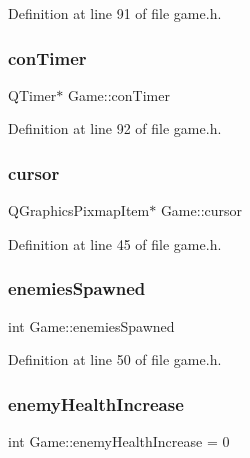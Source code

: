 Definition at line 91 of file game.\+h.

\mbox{\label{class_game_a266d51c575b09c22aac86e20487802f4}} 
\subsubsection{\texorpdfstring{con\+Timer}{conTimer}}
{\footnotesize\ttfamily Q\+Timer$\ast$ Game\+::con\+Timer}



Definition at line 92 of file game.\+h.

\mbox{\label{class_game_ac8bde3bd16f503846f66bbb866c3b7b9}} 
\subsubsection{\texorpdfstring{cursor}{cursor}}
{\footnotesize\ttfamily Q\+Graphics\+Pixmap\+Item$\ast$ Game\+::cursor}



Definition at line 45 of file game.\+h.

\mbox{\label{class_game_a6ac18c388eda83ceb3212e099b3b8473}} 
\subsubsection{\texorpdfstring{enemies\+Spawned}{enemiesSpawned}}
{\footnotesize\ttfamily int Game\+::enemies\+Spawned}



Definition at line 50 of file game.\+h.

\mbox{\label{class_game_ac0038cbbcfbd5d8b32600cd9f42cd09b}} 
\subsubsection{\texorpdfstring{enemy\+Health\+Increase}{enemyHealthIncrease}}
{\footnotesize\ttfamily int Game\+::enemy\+Health\+Increase = 0}



